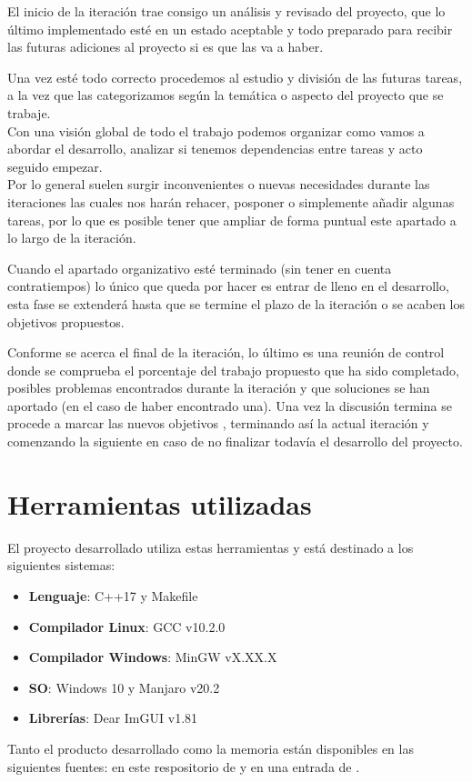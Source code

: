 El inicio de la iteración trae consigo un análisis y revisado del proyecto, que lo último
implementado esté en un estado aceptable y todo preparado para recibir las futuras adiciones
al proyecto si es que las va a haber.

Una vez esté todo correcto procedemos al estudio y división de las futuras tareas, a la vez 
que las categorizamos según la temática o aspecto del proyecto que se trabaje. \\
Con una visión global de todo el trabajo podemos organizar como vamos a
abordar el desarrollo, analizar si tenemos dependencias entre tareas y acto seguido empezar. \\
Por lo general suelen surgir inconvenientes o nuevas necesidades durante las iteraciones las
cuales nos harán rehacer, posponer o simplemente añadir algunas tareas, por lo que es posible
tener que ampliar de forma puntual este apartado a lo largo de la iteración.

Cuando el apartado organizativo esté terminado (sin tener en cuenta contratiempos) lo único 
que queda por hacer es entrar de lleno en el desarrollo, esta fase se extenderá hasta que
se termine el plazo de la iteración o se acaben los objetivos propuestos. 

Conforme se acerca el final de la iteración, lo último es una reunión de control donde 
se comprueba el porcentaje del trabajo propuesto que ha sido completado, posibles problemas 
encontrados durante la iteración y que soluciones se han aportado (en el caso de haber 
encontrado una). Una vez la discusión termina se procede a marcar las nuevos objetivos
, terminando así la actual iteración y comenzando la siguiente en caso de no finalizar 
todavía el desarrollo del proyecto.


\section{Herramientas utilizadas}
El proyecto desarrollado utiliza estas herramientas y está destinado a los siguientes
sistemas:
\begin{itemize}
	\item \textbf{Lenguaje}: C++17 y Makefile
	\item \textbf{Compilador Linux}: GCC v10.2.0
	\item \textbf{Compilador Windows}: MinGW vX.XX.X
	\item \textbf{SO}: Windows 10 y Manjaro v20.2
	\item \textbf{Librerías}: Dear ImGUI v1.81
\end{itemize}

Tanto el producto desarrollado como la memoria están disponibles en las siguientes fuentes: 
en este respositorio de \citeauthor*{BPW_GitHub_2021} y en una entrada de \citeauthor*{BPW_Archive_2021}.





